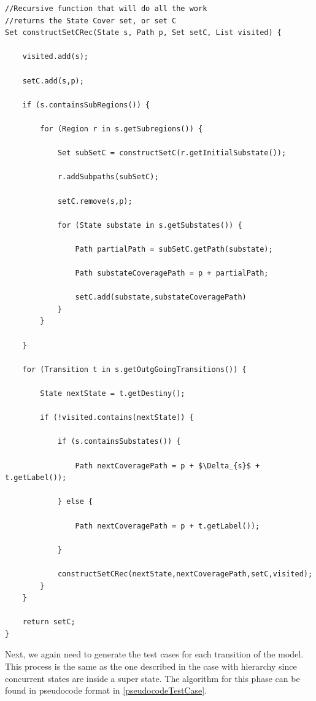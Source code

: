 \begin{lstlisting}[mathescape,label={testOrthogonalityPseudo}]
//Recursive function that will do all the work
//returns the State Cover set, or set C
Set constructSetCRec(State s, Path p, Set setC, List visited) {

	visited.add(s);

	setC.add(s,p);

	if (s.containsSubRegions()) {

		for (Region r in s.getSubregions()) {
			
			Set subSetC = constructSetC(r.getInitialSubstate());	

			r.addSubpaths(subSetC);

			setC.remove(s,p);

			for (State substate in s.getSubstates()) {
	
				Path partialPath = subSetC.getPath(substate);
	
				Path substateCoveragePath = p + partialPath;
	
				setC.add(substate,substateCoveragePath)	
			}
		}	
		
	}
	
	for (Transition t in s.getOutgGoingTransitions()) {
		
		State nextState = t.getDestiny();

		if (!visited.contains(nextState)) {

			if (s.containsSubstates()) {
			
				Path nextCoveragePath = p + $\Delta_{s}$ + t.getLabel());

			} else {

				Path nextCoveragePath = p + t.getLabel());

			}	

			constructSetCRec(nextState,nextCoveragePath,setC,visited);	
		}
	}
	
	return setC;
}
\end{lstlisting}

Next, we again need to generate the test cases for each transition of the model. This process is the same as the one described in the case with hierarchy since concurrent states are inside a super state. The algorithm for this phase can be found in pseudocode format in \ref{pseudocodeTestCase}.


